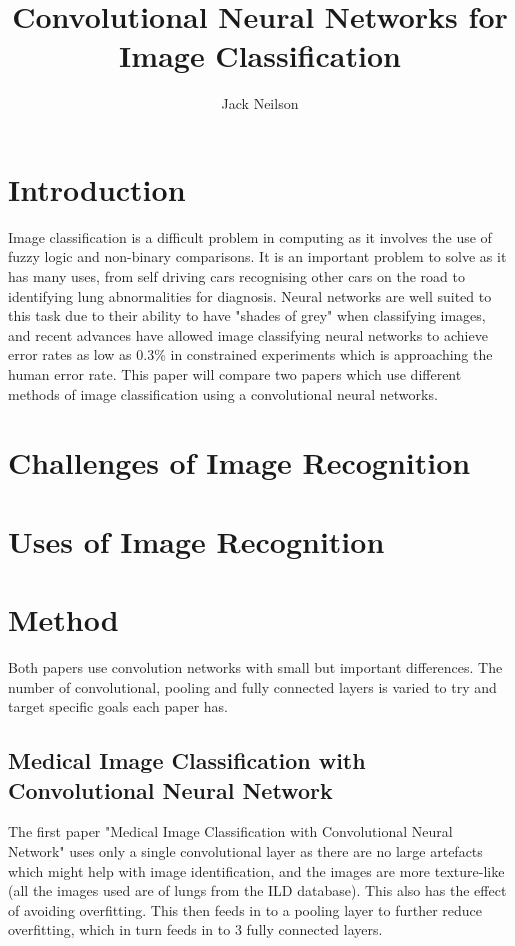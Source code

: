 \documentclass{article}
\begin{document}
\title{Convolutional Neural Networks for Image Classification}
\author{Jack Neilson}

\maketitle
\newpage
\section{Introduction}
Image classification is a difficult problem in computing as it involves the use of fuzzy logic and non-binary comparisons. It is an important problem to solve as it has many uses, from self driving cars recognising other cars on the road to identifying lung abnormalities for diagnosis\cite{medical}. Neural networks are well suited to this task due to their ability to have "shades of grey" when classifying images, and recent advances have allowed image classifying neural networks to achieve error rates as low as 0.3\% in constrained experiments which is approaching the human error rate\cite{imagenet}. This paper will compare two papers which use different methods of image classification using a convolutional neural networks.

\section{Challenges of Image Recognition}


\section{Uses of Image Recognition}


\section{Method}
Both papers use convolution networks with small but important differences. The number of convolutional, pooling and fully connected layers is varied to try and target specific goals each paper has.

\subsection{Medical Image Classification with Convolutional Neural Network}
The first paper "Medical Image Classification with Convolutional Neural Network" uses only a single convolutional layer as there are no large artefacts which might help with image identification, and the images are more texture-like (all the images used are of lungs from the ILD database)\cite{medical}. This also has the effect of avoiding overfitting\cite{medical}. This then feeds in to a pooling layer to further reduce overfitting, which in turn feeds in to 3 fully connected layers.
\end{document}

